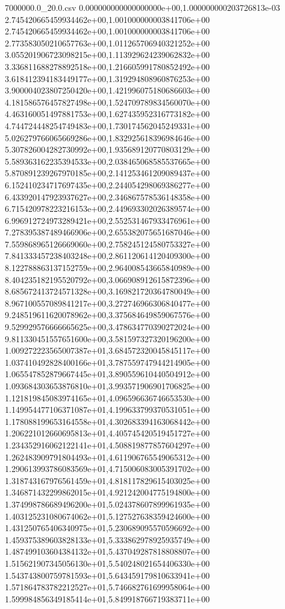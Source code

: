 \begin{filecontents*}{7000000.0_20.0.csv}
0.000000000000000000e+00,1.000000000203726813e-03
2.745420665459934462e+00,1.001000000003841706e+00
2.745420665459934462e+00,1.001000000003841706e+00
2.773583050210657763e+00,1.011265706940321252e+00
3.055201906723098215e+00,1.113929624239062832e+00
3.336811688278892518e+00,1.216605991780852492e+00
3.618412394183449177e+00,1.319294808960876253e+00
3.900004023807250420e+00,1.421996075180686603e+00
4.181586576457827498e+00,1.524709789834560070e+00
4.463160051497881753e+00,1.627435952316773182e+00
4.744724448254749483e+00,1.730174562045249331e+00
5.026279766065669286e+00,1.832925618396984646e+00
5.307826004282730992e+00,1.935689120770803129e+00
5.589363162235394533e+00,2.038465068585537665e+00
5.870891239267970185e+00,2.141253461209089437e+00
6.152410234717697435e+00,2.244054298069386277e+00
6.433920147923937627e+00,2.346867578536148358e+00
6.715420978223216153e+00,2.449693302026389574e+00
6.996912724973289421e+00,2.552531467933476961e+00
7.278395387489466906e+00,2.655382075651687046e+00
7.559868965126669060e+00,2.758245124580753327e+00
7.841333457238403248e+00,2.861120614120409300e+00
8.122788863137152759e+00,2.964008543665840989e+00
8.404235182195520792e+00,3.066908912615872396e+00
8.685672413724571328e+00,3.169821720364780049e+00
8.967100557089841217e+00,3.272746966306840477e+00
9.248519611620078962e+00,3.375684649859067576e+00
9.529929576666665625e+00,3.478634770390272024e+00
9.811330451557651600e+00,3.581597327320196200e+00
1.009272223565007387e+01,3.684572320045845117e+00
1.037410492828400166e+01,3.787559747944214905e+00
1.065547852879667445e+01,3.890559610440504912e+00
1.093684303653876810e+01,3.993571906901706825e+00
1.121819845083974165e+01,4.096596636746653530e+00
1.149954477106371087e+01,4.199633799370531051e+00
1.178088199653164558e+01,4.302683394163068442e+00
1.206221012660695813e+01,4.405745420519451727e+00
1.234352916062122141e+01,4.508819877857604297e+00
1.262483909791804493e+01,4.611906765549065312e+00
1.290613993786083569e+01,4.715006083005391702e+00
1.318743167976561459e+01,4.818117829615403025e+00
1.346871432299862015e+01,4.921242004775194800e+00
1.374998786689496200e+01,5.024378607899961935e+00
1.403125231080674062e+01,5.127527638359424600e+00
1.431250765406340975e+01,5.230689095570596692e+00
1.459375389603828133e+01,5.333862978925935749e+00
1.487499103604384132e+01,5.437049287818808807e+00
1.515621907345056130e+01,5.540248021654406330e+00
1.543743800759781593e+01,5.643459179810633941e+00
1.571864783782212527e+01,5.746682761699958064e+00
1.599984856349185414e+01,5.849918766719383711e+00

\end{filecontents*}
